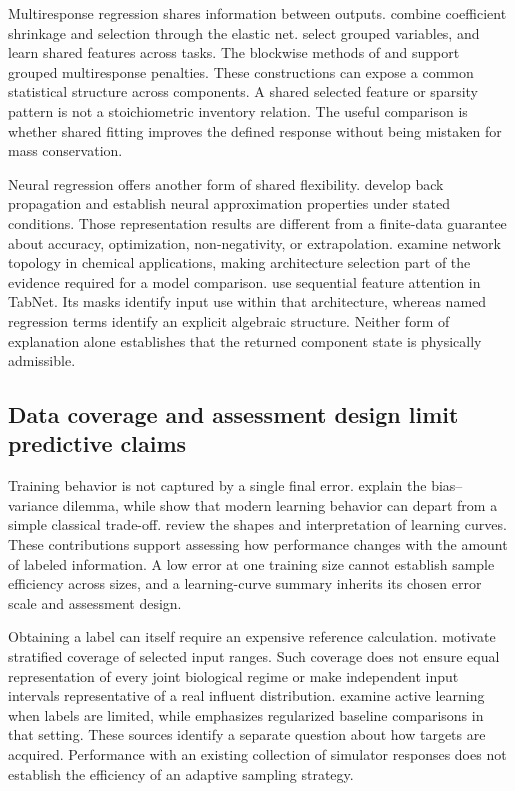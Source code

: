 Multiresponse regression shares information between outputs. \citet{Zou2005} combine coefficient shrinkage and selection through the elastic net. \citet{Yuan2006} select grouped variables, and \citet{Argyriou2008} learn shared features across tasks. The blockwise methods of \citet{Liu2009} and \citet{Simon2013} support grouped multiresponse penalties. These constructions can expose a common statistical structure across components. A shared selected feature or sparsity pattern is not a stoichiometric inventory relation. The useful comparison is whether shared fitting improves the defined response without being mistaken for mass conservation.

Neural regression offers another form of shared flexibility. \citet{Rumelhart1986} develop back propagation and \citet{Hornik1989} establish neural approximation properties under stated conditions. Those representation results are different from a finite-data guarantee about accuracy, optimization, non-negativity, or extrapolation. \citet{Curteanu2011} examine network topology in chemical applications, making architecture selection part of the evidence required for a model comparison. \citet{ArikPfister2021} use sequential feature attention in TabNet. Its masks identify input use within that architecture, whereas named regression terms identify an explicit algebraic structure. Neither form of explanation alone establishes that the returned component state is physically admissible.

\subsection{Data coverage and assessment design limit predictive claims}

Training behavior is not captured by a single final error. \citet{Geman1992} explain the bias--variance dilemma, while \citet{Belkin2019} show that modern learning behavior can depart from a simple classical trade-off. \citet{VieringLoog2023} review the shapes and interpretation of learning curves. These contributions support assessing how performance changes with the amount of labeled information. A low error at one training size cannot establish sample efficiency across sizes, and a learning-curve summary inherits its chosen error scale and assessment design.

Obtaining a label can itself require an expensive reference calculation. \citet{McKay1979} motivate stratified coverage of selected input ranges. Such coverage does not ensure equal representation of every joint biological regime or make independent input intervals representative of a real influent distribution. \citet{Guyon2011} examine active learning when labels are limited, while \citet{Cawley2011} emphasizes regularized baseline comparisons in that setting. These sources identify a separate question about how targets are acquired. Performance with an existing collection of simulator responses does not establish the efficiency of an adaptive sampling strategy.

